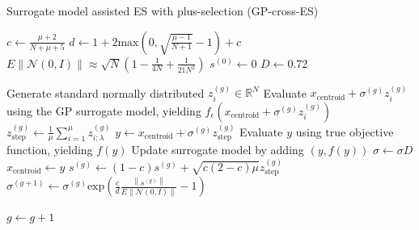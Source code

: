		


\begin{algorithm}
\caption{Surrogate model assisted ES with plus-selection (GP-cross-ES)}
\label{alg:GP-cross-ES}
\begin{algorithmic}[1]
\STATE $c \leftarrow  \frac{\mu +2}{N+\mu+5}$ 
\STATE $d \leftarrow 1 + 2 \text{max}(0, \sqrt{\frac{\mu - 1}{N+1} } - 1 ) + c$
\STATE $E \left\lVert  \mathcal{N}(0,I) \right\rVert \approx \sqrt{N}(1 - \frac{1}{4N} + \frac{1}{21N^2})$
\STATE $s^{(0)} \leftarrow 0$
\STATE $D \leftarrow 0.72$

		\STATE Generate standard normally distributed $z_i^{(g)} \in \mathbb{R}^N $
		\STATE Evaluate $x_{\text{centroid}}+ \sigma^{(g)} z_i^{(g)}$ using the GP surrogate model, yielding $f_{\epsilon}(x_{\text{centroid}} + \sigma^{(g)} z_i^{(g)})$
	\ENDFOR
	\STATE $z_{\text{step}}^{(g)} \leftarrow \frac{1}{\mu}\sum_{i=1}^{\mu} z_{i;\lambda}^{(g)}$
	\STATE $y  \leftarrow  x_{\text{centroid}} + \sigma^{(g)} z_{\text{step}}^{(g)}$ 
	\STATE Evaluate $y$ using true objective function, yielding $f(y)$
	\STATE Update surrogate model by adding $(y,f(y))$
		\STATE $\sigma \leftarrow \sigma D$
	\ELSE
		\STATE $ x_{\text{centroid}} \leftarrow y $
		\STATE $s^{(g)} \leftarrow (1-c)s^{(g)} + \sqrt{ c(2-c) \mu} z_{\text{step}}^{(g)}$
		\STATE $\sigma^{(g+1)} \leftarrow \sigma^{(g)}  \text{exp} \left(\frac{c}{d} \frac{\left\lVert s^{(g)} \right\rVert} { E \left\lVert \mathcal{N}(0,I) \right\rVert} -1 \right )$
	\ENDIF

	\STATE $g \leftarrow g + 1$
\ENDWHILE

\end{algorithmic}
\end{algorithm}


